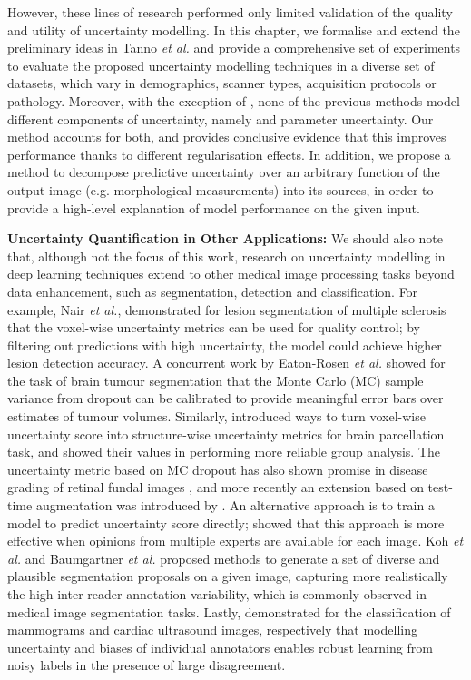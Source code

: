 However, these lines of research performed only limited validation of the quality and utility of uncertainty modelling. In this chapter, we formalise and extend the preliminary ideas in Tanno \emph{et al.} \cite{tanno2017bayesian} and provide a comprehensive set of experiments to evaluate the proposed uncertainty modelling techniques in a diverse set of datasets, which vary in demographics, scanner types, acquisition protocols or pathology. Moreover, with the exception of \cite{tanno2017bayesian}, none of the previous methods model different components of uncertainty, namely  and parameter uncertainty. Our method accounts for both, and provides conclusive evidence that this improves performance thanks to different regularisation effects. In addition, we propose a method to decompose predictive uncertainty over an arbitrary function of the output image (e.g. morphological measurements) into its sources, in order to provide a high-level explanation of model performance on the given input. 


\textbf{Uncertainty Quantification in Other Applications:}
We should also note that, although not the focus of this work, research on uncertainty modelling in deep learning techniques extend to other medical image processing tasks beyond data enhancement, such as segmentation, detection and classification. For example, Nair \emph{et al.}, \cite{nair2018exploring} demonstrated for lesion segmentation of multiple sclerosis that the voxel-wise uncertainty metrics can be used for quality control; by filtering out predictions with high uncertainty, the model could achieve higher lesion detection accuracy. A concurrent work by Eaton-Rosen \emph{et al.} \cite{eaton2018towards} showed for the task of brain tumour segmentation that the Monte Carlo (MC) sample variance from dropout \cite{gal2015dropout} can be calibrated to provide meaningful error bars over estimates of tumour volumes. Similarly,  \cite{roy2019bayesian} introduced ways to turn voxel-wise uncertainty score into structure-wise uncertainty metrics for brain parcellation task, and showed their values in performing more reliable group analysis. The uncertainty metric based on MC dropout has also shown promise in disease grading of retinal fundal images \cite{worrall2016automated,leibig2017leveraging}, and more recently an extension based on test-time augmentation was introduced by \cite{ayhan2018test}. An alternative approach is to train a model to predict uncertainty score directly; \cite{Raghu2018DirectUP} showed that this approach is more effective when opinions from multiple experts are available for each image. Koh \emph{et al.} \cite{kohl2018probabilistic} and Baumgartner \emph{et al.} \cite{PHiSeg2019Baumgartner} proposed methods to generate a set of diverse and plausible segmentation proposals on a given image, capturing more realistically the high inter-reader annotation variability, which is commonly observed in medical image segmentation tasks. Lastly, \cite{raykar2010learning,tanno2019learning} demonstrated for the classification of mammograms and cardiac ultrasound images, respectively that modelling uncertainty and biases of individual annotators enables robust learning from noisy labels in the presence of large disagreement. 


